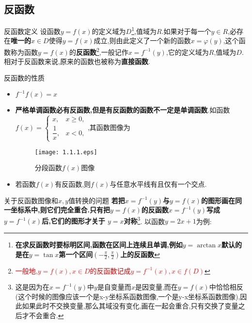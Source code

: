\documentclass[12pt, a4paper, oneside, UTF8]{ctexbook}  %
\begin{document}
\begin{sloppypar}
    \subsection{反函数}
    \begin{defn}{反函数定义}{}
        设函数$y=f(x)$的定义域为$D$\footnote{\textbf{在求反函数时要标明区间,函数在区间上连续且单调,例如$y=\arctan x$默认的是在$y=\tan x$第一个区间$(-\frac{\pi}{2},\frac{\pi}{2})$上的反函数}},值域为$R$.如果对于每一个$y \in R $,必存在\textbf{唯一的$x \in D$}使得$y=f(x)$成立,则由此定义了一个新的函数$x=\varphi(y)$,这个函数称为函数$y=f(x)$的\textbf{反函数}\footnote{\textcolor{red}{一般地,$y=f(x),x \in D$的反函数记成$y=f^{-1}\left(x\right),x\in f(D)$}},一般记作$x=f^{-1}(y)$,它的定义域为$R$,值域为$D$.相对于反函数来说,原来的函数也被称为\textbf{直接函数}.
    \end{defn}
    \begin{defn}{反函数的性质}{}
        \begin{itemize}
            \item $f^{-1}f(x)=x$
            \item \textbf{严格单调函数必有反函数,但是有反函数的函数不一定是单调函数}.如函数$f(x)=\begin{cases}x,&x\geqslant0, \\ \dfrac{1}{x},&x<0,\end{cases}$,其函数图像为
                  \begin{figure}[H]
                      \centering \texttt{[image: 1.1.1.eps]} \caption{分段函数$f(x)$图像}
                      \label{xxx1}
                  \end{figure}
            \item 若函数$f(x)$有反函数,则$f(x)$与任意水平线有且仅有一个交点.
        \end{itemize}
    \end{defn}
    \begin{criterion}{关于反函数图像和$x,y$值转换的问题}{}
        \textbf{若把$x=f^{-1}(y)$与$y=f(x)$的图形画在同一坐标系中,则它们完全重合.只有把$y=f(x)$的反函数$x=f^{-1}(y)$写成$y=f^{-1}(x)$后,它们的图形才关于 $y=x$对称}\footnote{这是因为在$x=f^{-1}(y)$中$y$是自变量而$x$是因变量,而在$y=f(x)$中恰恰相反(这个时候的图像应该一个是x-y坐标系函数图像,一个是y-x坐标系函数图像),因此如果此时不交换变量,那么其域没有变化,画在一起会重合,只有交换了变量之后才不会重合.}.
        以函数$y=2x+1$为例:
        \begin{center}

\end{center}
\end{criterion}
\end{sloppypar}
\end{document}

